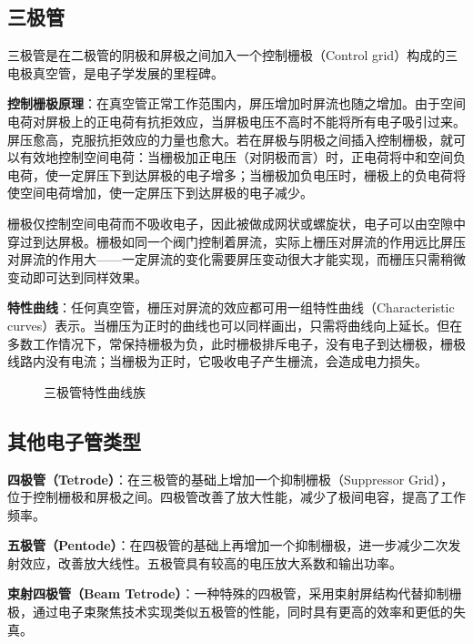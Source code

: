 \subsection{三极管}
\label{subsec:triode}

三极管是在二极管的阴极和屏极之间加入一个控制栅极（Control grid）构成的三电极真空管，是电子学发展的里程碑。

\textbf{控制栅极原理}：在真空管正常工作范围内，屏压增加时屏流也随之增加。由于空间电荷对屏极上的正电荷有抗拒效应，当屏极电压不高时不能将所有电子吸引过来。屏压愈高，克服抗拒效应的力量也愈大。若在屏极与阴极之间插入控制栅极，就可以有效地控制空间电荷：当栅极加正电压（对阴极而言）时，正电荷将中和空间负电荷，使一定屏压下到达屏极的电子增多；当栅极加负电压时，栅极上的负电荷将使空间电荷增加，使一定屏压下到达屏极的电子减少。

栅极仅控制空间电荷而不吸收电子，因此被做成网状或螺旋状，电子可以由空隙中穿过到达屏极。栅极如同一个阀门控制着屏流，实际上栅压对屏流的作用远比屏压对屏流的作用大——一定屏流的变化需要屏压变动很大才能实现，而栅压只需稍微变动即可达到同样效果。

\textbf{特性曲线}：任何真空管，栅压对屏流的效应都可用一组特性曲线（Characteristic curves）表示。当栅压为正时的曲线也可以同样画出，只需将曲线向上延长。但在多数工作情况下，常保持栅极为负，此时栅极排斥电子，没有电子到达栅极，栅极线路内没有电流；当栅极为正时，它吸收电子产生栅流，会造成电力损失。

\begin{figure}[htbp]
    \centering
    \caption{三极管特性曲线族}
    \label{fig:triode_characteristic}
\end{figure}

\subsection{其他电子管类型}
\label{subsec:other_tube_types}

\textbf{四极管（Tetrode）}：在三极管的基础上增加一个抑制栅极（Suppressor Grid），位于控制栅极和屏极之间。四极管改善了放大性能，减少了极间电容，提高了工作频率。

\textbf{五极管（Pentode）}：在四极管的基础上再增加一个抑制栅极，进一步减少二次发射效应，改善放大线性。五极管具有较高的电压放大系数和输出功率。

\textbf{束射四极管（Beam Tetrode）}：一种特殊的四极管，采用束射屏结构代替抑制栅极，通过电子束聚焦技术实现类似五极管的性能，同时具有更高的效率和更低的失真。
